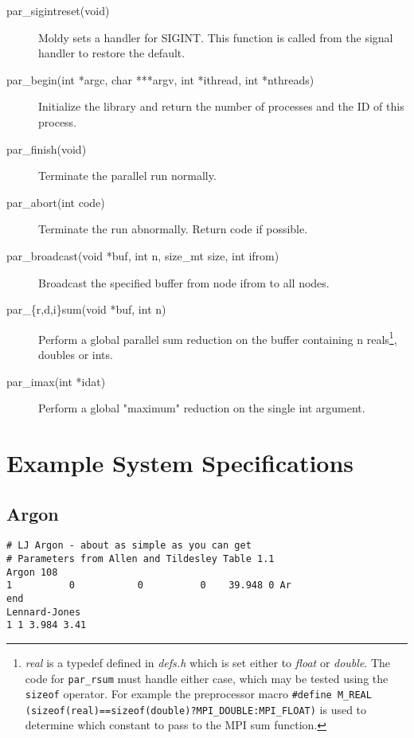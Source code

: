 \documentclass[twoside]{report}
\begin{document}
\begin{description}
\sloppy
\item[par\_sigintreset(void)] Moldy sets a handler for SIGINT\@.  This
  function is called from the signal handler to restore the default.
\item[par\_begin(int *argc, char ***argv, int *ithread, int
  *nthreads)] Initialize the library and return the number of
  processes and the ID of this process.
\item[par\_finish(void)] Terminate the parallel run normally.
\item[par\_abort(int code)] Terminate the run abnormally.  Return code
  if possible.
\item[par\_broadcast(void *buf, int n, size\_mt size, int ifrom)]
  Broadcast the specified buffer from node ifrom to all nodes.
\item[par\_\{r,d,i\}sum(void *buf, int n)] Perform a global parallel sum
  reduction on the buffer containing n reals\footnote{{\em real}\/ is a
    typedef defined in {\em defs.h}\/ which is set either to {\em
      float}\/ or {\em double}.  The code for \texttt{par\_rsum} must
    handle either case, which may be tested using the \texttt{sizeof}
    operator. For example the preprocessor macro 
    \texttt{\#define M\_REAL
      (sizeof(real)==sizeof(double)?MPI\_DOUBLE:MPI\_FLOAT)} is used
    to determine which constant to pass to the MPI sum function.},
  doubles or ints.
\item[par\_imax(int *idat)] Perform a global "maximum" reduction on
  the single int argument.
\fussy
\end{description}

\appendix
\chapter{Example System Specifications}  %
\label{sec:examples}
\section{Argon}%
\begin{verbatim}
# LJ Argon - about as simple as you can get
# Parameters from Allen and Tildesley Table 1.1
Argon 108
1          0           0          0    39.948 0 Ar
end
Lennard-Jones
1 1 3.984 3.41
\end{verbatim}
\end{document}
